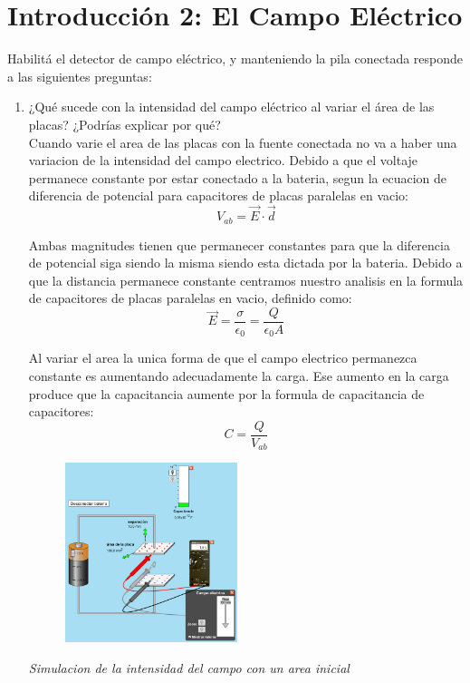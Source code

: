 \documentclass[12pt]{report}
\begin{document}
\section{Introducción 2: El Campo Eléctrico}

Habilitá el detector de campo eléctrico, y manteniendo la pila conectada responde a las siguientes preguntas:\\

\begin{enumerate}
    \item ¿Qué sucede con la intensidad del campo eléctrico al variar el área de las placas? ¿Podrías explicar por qué?\\

    Cuando varie el area de las placas con la fuente conectada no va a haber una variacion de la intensidad del campo electrico. Debido a que el voltaje permanece constante por estar conectado a la bateria, segun la ecuacion de diferencia de potencial para capacitores de placas paralelas en vacio:\\

    \[V_{ab}=\vec{E} \cdot \vec{d}\]

    Ambas magnitudes tienen que permanecer constantes para que la diferencia de potencial siga siendo la misma siendo esta dictada por la bateria. Debido a que la distancia permanece constante centramos nuestro analisis en la formula de capacitores de placas paralelas en vacio, definido como:\\

    \[\vec{E}=\frac{\sigma}{\epsilon_0}=\frac{Q}{\epsilon_0 A}\]

    Al variar el area la unica forma de que el campo electrico permanezca constante es aumentando adecuadamente la carga. Ese aumento en la carga produce que la capacitancia aumente por la formula de capacitancia de capacitores:\\


    \[C=\frac{Q}{V_{ab}}\]

    \newpage

\begin{figure}[h]
    \centering
    \includegraphics[width=0.475\textwidth]{./images/2FOTO1.png}
\end{figure}
    \textit{Simulacion de la intensidad del campo con un area inicial}\\



\end{enumerate}
\end{document}
